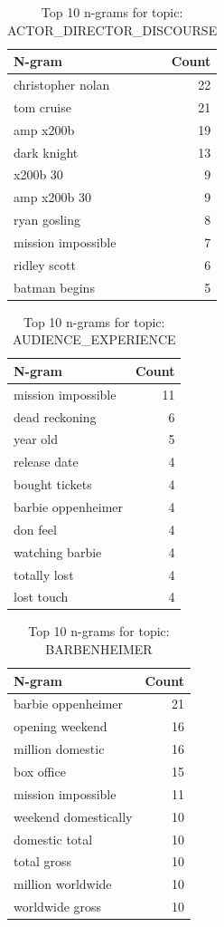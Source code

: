 \begin{table}[h]
\centering
\caption{Top 10 n-grams for topic: ACTOR_DIRECTOR_DISCOURSE}
\begin{tabular}{lr}
\hline
N-gram & Count \\
\hline
christopher nolan & 22 \\
tom cruise & 21 \\
amp x200b & 19 \\
dark knight & 13 \\
x200b 30 & 9 \\
amp x200b 30 & 9 \\
ryan gosling & 8 \\
mission impossible & 7 \\
ridley scott & 6 \\
batman begins & 5 \\
\hline
\end{tabular}
\end{table}

\begin{table}[h]
\centering
\caption{Top 10 n-grams for topic: AUDIENCE_EXPERIENCE}
\begin{tabular}{lr}
\hline
N-gram & Count \\
\hline
mission impossible & 11 \\
dead reckoning & 6 \\
year old & 5 \\
release date & 4 \\
bought tickets & 4 \\
barbie oppenheimer & 4 \\
don feel & 4 \\
watching barbie & 4 \\
totally lost & 4 \\
lost touch & 4 \\
\hline
\end{tabular}
\end{table}

\begin{table}[h]
\centering
\caption{Top 10 n-grams for topic: BARBENHEIMER}
\begin{tabular}{lr}
\hline
N-gram & Count \\
\hline
barbie oppenheimer & 21 \\
opening weekend & 16 \\
million domestic & 16 \\
box office & 15 \\
mission impossible & 11 \\
weekend domestically & 10 \\
domestic total & 10 \\
total gross & 10 \\
million worldwide & 10 \\
worldwide gross & 10 \\
\hline
\end{tabular}
\end{table}

